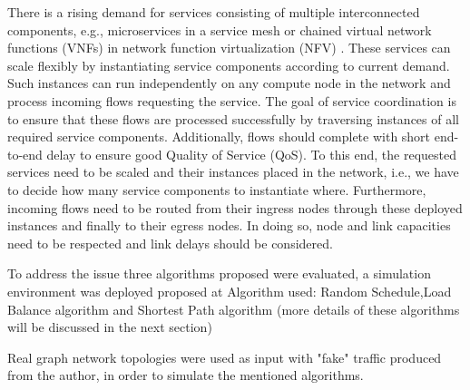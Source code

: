 There is a rising demand for services consisting of multiple
interconnected components, e.g., microservices in a service
mesh or chained virtual network functions (VNFs) in network function virtualization (NFV) \cite{12}. These services can
scale flexibly by instantiating service components according
to current demand. Such instances can run independently on
any compute node in the network and process incoming flows
requesting the service.
The goal of service coordination is to ensure that these
flows are processed successfully by traversing instances of
all required service components. Additionally, flows should
complete with short end-to-end delay to ensure good Quality
of Service (QoS). To this end, the requested services need to be
scaled and their instances placed in the network, i.e., we have
to decide how many service components to instantiate where.
Furthermore, incoming flows need to be routed from their
ingress nodes through these deployed instances and finally to
their egress nodes. In doing so, node and link capacities need
to be respected and link delays should be considered.

To address the issue three algorithms proposed were evaluated, a simulation environment was deployed proposed at \cite{12}
Algorithm used: Random Schedule,Load Balance algorithm and Shortest Path algorithm (more details of these algorithms will be discussed in the next section)

Real graph network topologies were used as input with "fake" traffic produced from the author, in order to simulate the mentioned algorithms.